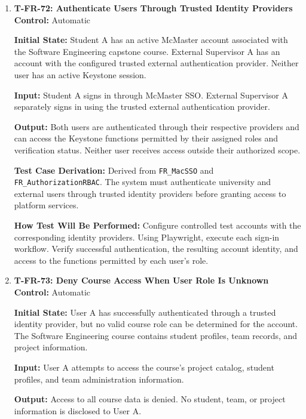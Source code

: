 \documentclass[12pt, titlepage]{article}
\begin{document}
\begin{enumerate}

\item \label{T-FR-72}\textbf{T-FR-72: Authenticate Users Through Trusted Identity Providers}\\

\textbf{Control:} Automatic

\textbf{Initial State:} Student A has an active McMaster account associated with the Software Engineering capstone course. External Supervisor A has an account with the configured trusted external authentication provider. Neither user has an active Keystone session.

\textbf{Input:} Student A signs in through McMaster SSO. External Supervisor A separately signs in using the trusted external authentication provider.

\textbf{Output:} Both users are authenticated through their respective providers and can access the Keystone functions permitted by their assigned roles and verification status. Neither user receives access outside their authorized scope.

\textbf{Test Case Derivation:} Derived from \texttt{FR\_MacSSO} and \texttt{FR\_AuthorizationRBAC}. The system must authenticate university and external users through trusted identity providers before granting access to platform services.

\textbf{How Test Will Be Performed:} Configure controlled test accounts with the corresponding identity providers. Using Playwright, execute each sign-in workflow. Verify successful authentication, the resulting account identity, and access to the functions permitted by each user's role.

\item \label{T-FR-73}\textbf{T-FR-73: Deny Course Access When User Role Is Unknown}\\

\textbf{Control:} Automatic

\textbf{Initial State:} User A has successfully authenticated through a trusted identity provider, but no valid course role can be determined for the account. The Software Engineering course contains student profiles, team records, and project information.

\textbf{Input:} User A attempts to access the course's project catalog, student profiles, and team administration information.

\textbf{Output:} Access to all course data is denied. No student, team, or project information is disclosed to User A.


\end{enumerate}
\end{document}
